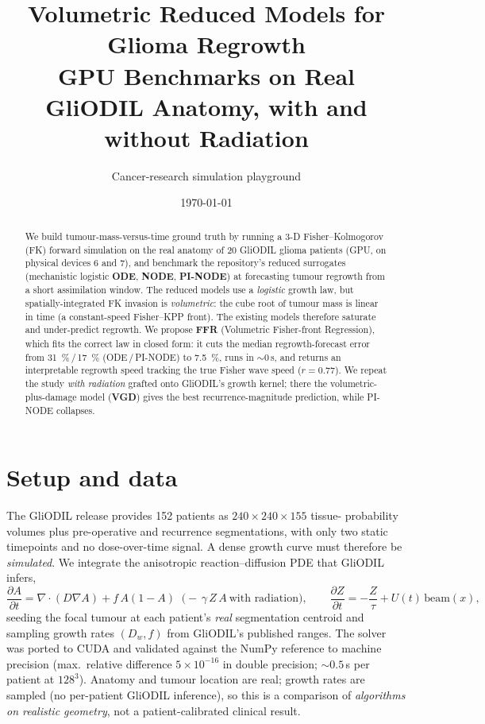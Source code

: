 \documentclass[11pt]{article}
\title{\textbf{Volumetric Reduced Models for Glioma Regrowth}\\[2pt]
\large GPU Benchmarks on Real GliODIL Anatomy, with and without Radiation}
\author{Cancer-research simulation playground}
\date{\today}
\begin{document}
\maketitle

\begin{abstract}
We build tumour-mass-versus-time ground truth by running a 3-D
Fisher--Kolmogorov (FK) forward simulation on the real anatomy of 20 GliODIL
glioma patients (GPU, on physical devices 6 and 7), and benchmark the
repository's reduced surrogates (mechanistic logistic \textbf{ODE},
\textbf{NODE}, \textbf{PI-NODE}) at forecasting tumour regrowth from a short
assimilation window. The reduced models use a \emph{logistic} growth law, but
spatially-integrated FK invasion is \emph{volumetric}: the cube root of tumour
mass is linear in time (a constant-speed Fisher--KPP front). The existing models
therefore saturate and under-predict regrowth. We propose \textbf{FFR}
(Volumetric Fisher-front Regression), which fits the correct law in closed form:
it cuts the median regrowth-forecast error from \SI{31}{\percent}\,/\,\SI{17}{\percent}
(ODE\,/\,PI-NODE) to \SI{7.5}{\percent}, runs in ${\sim}0$\,s, and returns an
interpretable regrowth speed tracking the true Fisher wave speed
($r=0.77$). We repeat the study \emph{with radiation} grafted onto GliODIL's
growth kernel; there the volumetric-plus-damage model (\textbf{VGD}) gives the
best recurrence-magnitude prediction, while PI-NODE collapses.
\end{abstract}

\section{Setup and data}
The GliODIL release provides 152 patients as $240\times240\times155$ tissue-
probability volumes plus pre-operative and recurrence segmentations, with only
two static timepoints and no dose-over-time signal. A dense growth curve must
therefore be \emph{simulated}. We integrate the anisotropic reaction--diffusion
PDE that GliODIL infers,
\begin{equation}
\frac{\partial A}{\partial t}=\nabla\!\cdot(D\nabla A)+f\,A(1-A)
\;\;\bigl(-\,\gamma\,Z\,A\ \text{with radiation}\bigr),
\qquad
\frac{\partial Z}{\partial t}=-\frac{Z}{\tau}+U(t)\,\mathrm{beam}(x),
\label{eq:fk}
\end{equation}
seeding the focal tumour at each patient's \emph{real} segmentation centroid and
sampling growth rates $(D_w,f)$ from GliODIL's published ranges. The solver was
ported to CUDA and validated against the NumPy reference to machine precision
(max.\ relative difference $5\times10^{-16}$ in double precision;
$\sim\!0.5$\,s per patient at $128^3$). Anatomy and tumour location are real;
growth rates are sampled (no per-patient GliODIL inference), so this is a
comparison of \emph{algorithms on realistic geometry}, not a patient-calibrated
clinical result.
\end{document}
